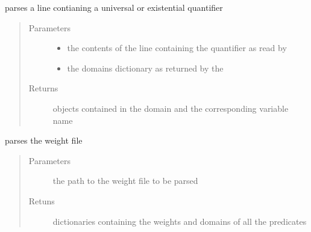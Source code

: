 \documentclass[letterpaper,10pt,english,openany,oneside]{sphinxmanual}
\begin{document}
\begin{fulllineitems}
\begin{fulllineitems}
\end{fulllineitems}


\begin{fulllineitems}
\label{\detokenize{index:parser.Parser.parseQuantifier}}
parses a line contianing a universal or existential quantifier
\begin{quote}\begin{description}
\item[{Parameters}] \leavevmode\begin{itemize}
\item {} 
 \textendash{} the contents of the line containing the quantifier as read by {\hyperref[\detokenize{index:parser.Parser.parseCircuit}]{}}

\item {} 
 \textendash{} the domains dictionary as returned by the {\hyperref[\detokenize{index:parser.Parser.parseWeights}]{}}

\end{itemize}

\item[{Returns}] \leavevmode
objects contained in the domain and the corresponding variable name

\end{description}\end{quote}

\end{fulllineitems}


\begin{fulllineitems}
\label{\detokenize{index:parser.Parser.parseWeights}}
parses the weight file
\begin{quote}\begin{description}
\item[{Parameters}] \leavevmode
{} \textendash{} the path to the weight file to be parsed

\item[{Retuns}] \leavevmode
dictionaries containing the weights and domains of all the predicates

\end{description}\end{quote}

\end{fulllineitems}


\end{fulllineitems}
\end{document}
